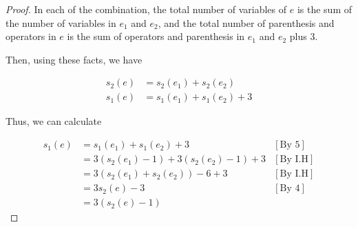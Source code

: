 \documentclass[12pt]{article}
\begin{document}
\begin{itemize}
\begin{proof}
    \bigskip

    In each of the combination, the total number of variables of $e$
    is the sum of the number of variables in $e_1$ and $e_2$, and the
    total number of parenthesis and operators in $e$ is the sum of
    operators and parenthesis in $e_1$ and $e_2$ plus 3.

    \bigskip

    Then, using these facts, we have

    \bigskip

    \begin{align}
        s_2(e) &= s_2(e_1) + s_2(e_2)\\
        s_1(e) &= s_1(e_1) + s_1(e_2) + 3
    \end{align}

    \bigskip

    Thus, we can calculate

    \begin{align}
        s_1(e) &= s_1(e_1) + s_1(e_2) + 3 & [\text{By 5}]\\
        &= 3(s_2(e_1) - 1) + 3(s_2(e_2) - 1) + 3 & [\text{By I.H}]\\
        &= 3(s_2(e_1) + s_2(e_2)) - 6 + 3 & [\text{By I.H}]\\
        &= 3s_2(e) - 3 & [\text{By 4}]\\
        &= 3(s_2(e) - 1)
    \end{align}

    \end{proof}












\end{itemize}
\end{document}
